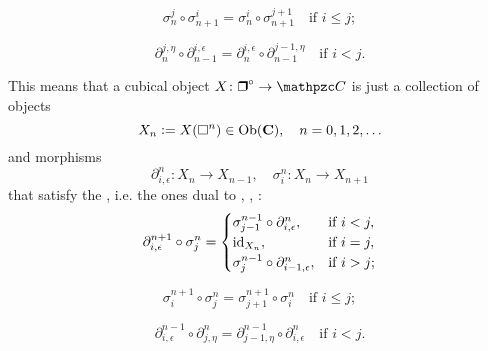 \begin{equation}
  \label{eqn:cocubical-identity-2}
  \sigma^j_n \circ \sigma^i_{n+1} = \sigma^i_n \circ \sigma^{j+1}_{n+1}
  \quad \text{if }i \le j;
\end{equation}

\begin{equation}
  \label{eqn:cocubical-identity-3}
  \partial^{j,\eta}_n \circ \partial^{i,\epsilon}_{n-1}
  = \partial^{i,\epsilon}_n \circ \partial^{j-1,\eta}_{n-1}
  \quad \text{if } i < j.
\end{equation}

This means that a cubical object $X\colon \bsquare^\circ \to \vcateg{C}$ is just
a collection of objects
$$X_n \mathrel{\mathop:}= X (\square^n) \in \operatorname{Ob} (\text{\bf C}), \quad n = 0,1,2,\ldots$$
and morphisms
$$\partial_{i,\epsilon}^n\colon X_n \to X_{n-1}, \quad \sigma_i^n\colon X_n \to X_{n+1}$$
that satisfy the , i.e. the ones dual to
, ,
:
\begin{equation}
  \label{eqn:cubical-identity-1}
  \partial_{i,\epsilon}^{n+1} \circ \sigma_j^n
  = \begin{cases}
    \sigma_{j-1}^{n-1} \circ \partial_{i,\epsilon}^n, & \text{if }i < j, \\
    \mathrm{id}_{X_n}, & \text{if }i = j, \\
    \sigma_j^{n-1} \circ \partial_{i-1,\epsilon}^n, & \text{if }i > j;
  \end{cases}
\end{equation}

\begin{equation}
  \label{eqn:cubical-identity-2}
  \sigma_i^{n+1} \circ \sigma_j^n = \sigma_{j+1}^{n+1} \circ \sigma_i^n
  \quad \text{if }i \le j;
\end{equation}

\begin{equation}
  \label{eqn:cubical-identity-3}
  \partial_{i,\epsilon}^{n-1} \circ \partial_{j,\eta}^n
  = \partial_{j-1,\eta}^{n-1} \circ \partial_{i,\epsilon}^n
  \quad \text{if } i < j.
\end{equation}

